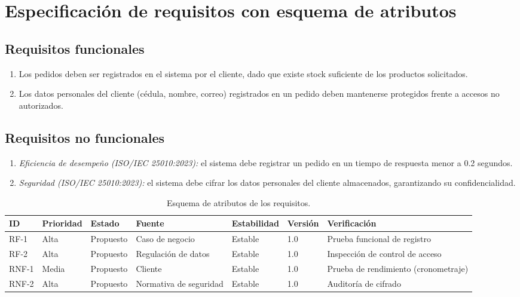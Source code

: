 \documentclass[11pt,a4paper]{article}
\begin{document}
\FloatBarrier

\section{Especificación de requisitos con esquema de atributos}

\subsection*{Requisitos funcionales}
\begin{enumerate}[label=\textbf{RF-\arabic*}]
    \item Los pedidos deben ser registrados en el sistema por el cliente, dado que existe stock suficiente de los productos solicitados.
    \item Los datos personales del cliente (cédula, nombre, correo) registrados en un pedido deben mantenerse protegidos frente a accesos no autorizados.
\end{enumerate}

\subsection*{Requisitos no funcionales}
\begin{enumerate}[label=\textbf{RNF-\arabic*}]
    \item \emph{Eficiencia de desempeño (ISO/IEC 25010:2023):} el sistema debe registrar un pedido en un tiempo de respuesta menor a 0.2 segundos.
    \item \emph{Seguridad (ISO/IEC 25010:2023):} el sistema debe cifrar los datos personales del cliente almacenados, garantizando su confidencialidad.
\end{enumerate}

\begin{table}[H]
\centering
\small
\begin{tabular}{L{1.6cm} L{2cm} L{1.8cm} L{1.6cm} L{2cm} L{1.3cm} L{3.2cm}}
\toprule
\textbf{ID} & \textbf{Prioridad} & \textbf{Estado} & \textbf{Fuente} & \textbf{Estabilidad} & \textbf{Versión} & \textbf{Verificación} \\
\midrule
RF-1  & Alta & Propuesto & Caso de negocio & Estable & 1.0 & Prueba funcional de registro \\
RF-2  & Alta & Propuesto & Regulación de datos & Estable & 1.0 & Inspección de control de acceso \\
RNF-1 & Media & Propuesto & Cliente & Estable & 1.0 & Prueba de rendimiento (cronometraje) \\
RNF-2 & Alta & Propuesto & Normativa de seguridad & Estable & 1.0 & Auditoría de cifrado \\
\bottomrule
\end{tabular}
\caption{Esquema de atributos de los requisitos.}
\end{table}
\end{document}
